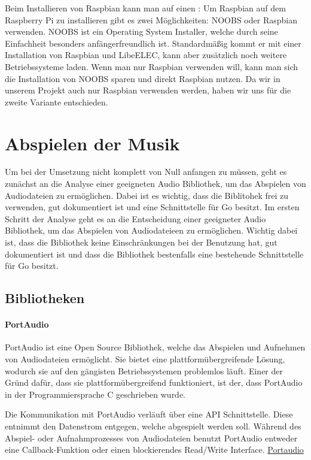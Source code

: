 Beim Installieren von Raspbian kann man auf einen :
Um Raspbian auf dem Raspberry Pi zu installieren gibt es zwei Möglichkeiten:
\ac{NOOBS} oder Raspbian verwenden. \ac{NOOBS} ist ein Operating System
Installer, welche durch seine Einfachheit besonders anfängerfreundlich ist.
Standardmäßig kommt er mit einer Installation von Raspbian und LibeELEC, kann
aber zusätzlich noch weitere Betriebssysteme laden. Wenn man nur Raspbian
verwenden will, kann man sich die Installation von \ac{NOOBS} sparen und direkt
Raspbian nutzen. Da wir in unserem Projekt auch nur Raspbian verwenden werden,
haben wir uns für die zweite Variante entschieden.


\section{Abspielen der Musik}
Um bei der Umsetzung nicht komplett von Null anfangen zu müssen, geht es
zunächst an die Analyse einer geeigneten Audio Bibliothek, um das Abspielen von
Audiodateien zu ermöglichen. Dabei ist es wichtig, dass die Biblitohek frei zu
verwenden, gut dokumentiert ist und eine Schnittstelle für Go besitzt.  Im
ersten Schritt der Analyse geht es an die Entscheidung einer geeigneter Audio
Bibliothek, um das Abspielen von Audiodateieen zu ermöglichen. Wichtig dabei
ist, dass die Bibliothek keine Einschränkungen bei der Benutzung hat, gut
dokumentiert ist und dass die Bibliothek bestenfalls eine bestehende
Schnittstelle für Go besitzt.
\subsection{Bibliotheken}
\paragraph{PortAudio}
PortAudio ist eine Open Source Bibliothek, welche das Abspielen und Aufnehmen
von Audiodateien ermöglicht. Sie bietet eine plattformübergreifende Lösung,
wodurch sie auf den gängisten Betriebssystemen problemlos läuft. Einer der
Gründ dafür, dass sie plattformübergreifend funktioniert, ist der, dass
PortAudio in der Programmiersprache C geschrieben wurde. \hfill \break

Die Kommunikation mit PortAudio verläuft über eine \ac{API} Schnittstelle.
Diese entnimmt den Datenstrom entgegen, welche abgespielt werden soll. Während
des Abspiel- oder Aufnahmprozesses von Audiodateien benutzt PortAudio entweder
eine Callback-Funktion oder einen blockierendes Read/Write Interface.
\href{http://www.portaudio.com/}{Portaudio}


